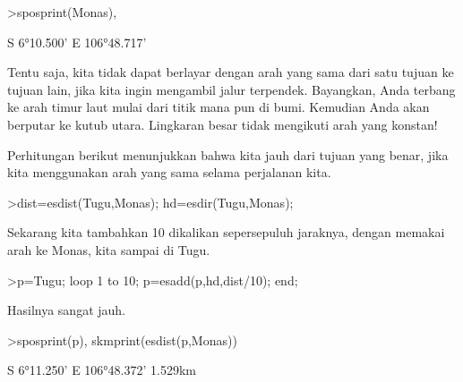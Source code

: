 \documentclass[a4paper,10pt]{article}
\begin{document}
\begin{eulernotebook}
\begin{eulercomment}
\begin{eulercomment}
\begin{eulercomment}
\begin{eulercomment}
\begin{eulercomment}
\begin{eulercomment}
\begin{eulercomment}
\begin{eulercomment}
\begin{eulercomment}
\begin{eulercomment}
\begin{eulercomment}
\begin{eulercomment}
\begin{eulercomment}
\begin{eulercomment}
\begin{eulercomment}
\begin{eulercomment}
\begin{eulercomment}
\begin{eulercomment}
\begin{eulercomment}
\begin{eulercomment}
\begin{eulercomment}
\begin{eulercomment}
\begin{eulercomment}
\begin{eulercomment}
\begin{eulercomment}
\begin{eulercomment}
\begin{eulercomment}
\begin{eulercomment}
\begin{eulercomment}
\begin{eulercomment}
\begin{eulercomment}
\begin{eulercomment}
\begin{eulercomment}
\begin{eulercomment}
\begin{eulerprompt}
>sposprint(Monas),
\end{eulerprompt}
\begin{euleroutput}
  S 6°10.500' E 106°48.717'
\end{euleroutput}
\begin{eulercomment}
Tentu saja, kita tidak dapat berlayar dengan arah yang sama dari satu
tujuan ke tujuan lain, jika kita ingin mengambil jalur terpendek.
Bayangkan, Anda terbang ke arah timur laut mulai dari titik mana pun
di bumi. Kemudian Anda akan berputar ke kutub utara. Lingkaran besar
tidak mengikuti arah yang konstan!

Perhitungan berikut menunjukkan bahwa kita jauh dari tujuan yang
benar, jika kita menggunakan arah yang sama selama perjalanan kita.
\end{eulercomment}
\begin{eulerprompt}
>dist=esdist(Tugu,Monas); hd=esdir(Tugu,Monas);
\end{eulerprompt}
\begin{eulercomment}
Sekarang kita tambahkan 10 dikalikan sepersepuluh jaraknya, dengan
memakai arah ke Monas, kita sampai di Tugu.
\end{eulercomment}
\begin{eulerprompt}
>p=Tugu; loop 1 to 10; p=esadd(p,hd,dist/10); end;
\end{eulerprompt}
\begin{eulercomment}
Hasilnya sangat jauh.
\end{eulercomment}
\begin{eulerprompt}
>sposprint(p), skmprint(esdist(p,Monas))
\end{eulerprompt}
\begin{euleroutput}
  S 6°11.250' E 106°48.372'
       1.529km
\end{euleroutput}
\begin{eulercomment}

\end{eulercomment}
\end{eulercomment}
\end{eulercomment}
\end{eulercomment}
\end{eulercomment}
\end{eulercomment}
\end{eulercomment}
\end{eulercomment}
\end{eulercomment}
\end{eulercomment}
\end{eulercomment}
\end{eulercomment}
\end{eulercomment}
\end{eulercomment}
\end{eulercomment}
\end{eulercomment}
\end{eulercomment}
\end{eulercomment}
\end{eulercomment}
\end{eulercomment}
\end{eulercomment}
\end{eulercomment}
\end{eulercomment}
\end{eulercomment}
\end{eulercomment}
\end{eulercomment}
\end{eulercomment}
\end{eulercomment}
\end{eulercomment}
\end{eulercomment}
\end{eulercomment}
\end{eulercomment}
\end{eulercomment}
\end{eulercomment}
\end{eulercomment}
\end{eulernotebook}
\end{document}

